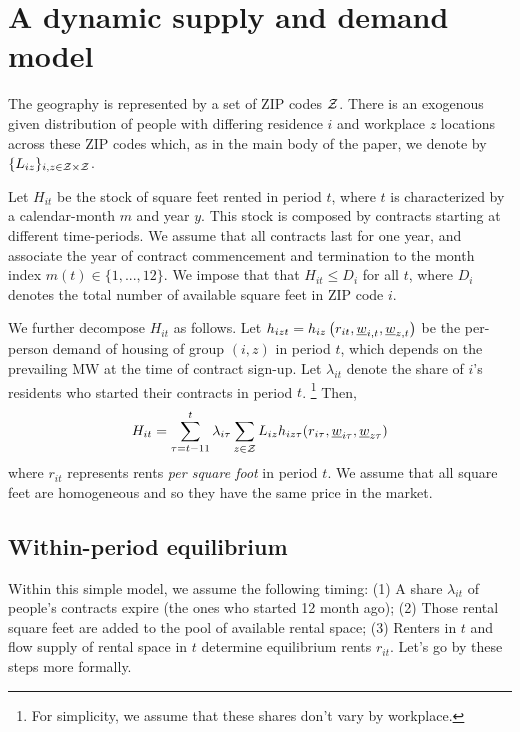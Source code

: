 
\section{A dynamic supply and demand model}\label{sec:dyn_theory_model}

The geography is represented by a set of ZIP codes $\mathcal{Z}$.
There is an exogenous given distribution of people with differing residence $i$ and 
workplace $z$ locations across these ZIP codes which,
as in the main body of the paper, we denote by $\{L_{iz}\}_{i,z\in\mathcal{Z}\times\mathcal{Z}}$.

Let $H_{it}$ be the stock of square feet rented in period $t$, where $t$ is characterized 
by a calendar-month $m$ and year $y$.
This stock is composed by contracts starting at different time-periods. 
We assume that all contracts last for one year, and associate the year of contract
commencement and termination to the month index $m(t)\in\{1,...,12\}$.
We impose that that $H_{it} \leq D_i$ for all $t$, where $D_i$ denotes the total number 
of available square feet in ZIP code $i$.

We further decompose $H_{it}$ as follows. 
Let $h_{izt} = h_{iz}\left(r_{it}, \underline{w}_{i,t}, \underline{w}_{z,t}\right)$ be the 
per-person demand of housing of group $(i,z)$ in period $t$,
which depends on the prevailing MW at the time of contract sign-up.
Let $\lambda_{it}$ denote the share of $i$'s residents who started their contracts in 
period $t$.%
\footnote{For simplicity, we assume that these shares don't vary by workplace.}
Then,
$$
H_{it} = \sum_{\tau = t - 11}^t \lambda_{i\tau} \sum_{z\in\mathcal{Z}} L_{iz} 
h_{iz\tau} (r_{i\tau}, \underline{w}_{i\tau}, \underline{w}_{z\tau})
$$
where 
$r_{it}$ represents rents \textit{per square foot} in period $t$. 
We assume that all square feet are homogeneous and so they have the same price in the 
market.

\subsection*{Within-period equilibrium}

Within this simple model, we assume the following timing: 
(1) A share $\lambda_{it}$ of people's contracts expire (the ones who started 12 month 
ago);
(2) Those rental square feet are added to the pool of available rental space;
(3) Renters in $t$ and flow supply of rental space in $t$ determine equilibrium rents 
$r_{it}$.
Let's go by these steps more formally.

